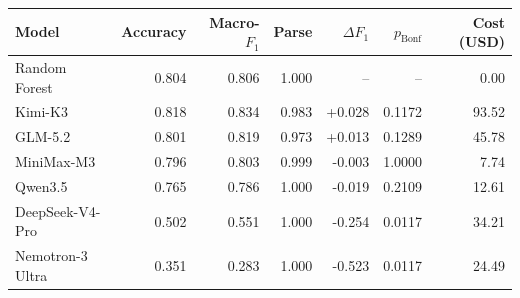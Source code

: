 \begin{tabular}{@{}lrrrrrr@{}}
\toprule
Model & Accuracy & Macro-$F_1$ & Parse & $\Delta F_1$ & $p_{\mathrm{Bonf}}$ & Cost (USD) \\
\midrule
Random Forest & 0.804 & 0.806 & 1.000 & -- & -- & 0.00 \\
Kimi-K3 & 0.818 & 0.834 & 0.983 & +0.028 & 0.1172 & 93.52 \\
GLM-5.2 & 0.801 & 0.819 & 0.973 & +0.013 & 0.1289 & 45.78 \\
MiniMax-M3 & 0.796 & 0.803 & 0.999 & -0.003 & 1.0000 & 7.74 \\
Qwen3.5 & 0.765 & 0.786 & 1.000 & -0.019 & 0.2109 & 12.61 \\
DeepSeek-V4-Pro & 0.502 & 0.551 & 1.000 & -0.254 & 0.0117 & 34.21 \\
Nemotron-3 Ultra & 0.351 & 0.283 & 1.000 & -0.523 & 0.0117 & 24.49 \\
\bottomrule
\end{tabular}